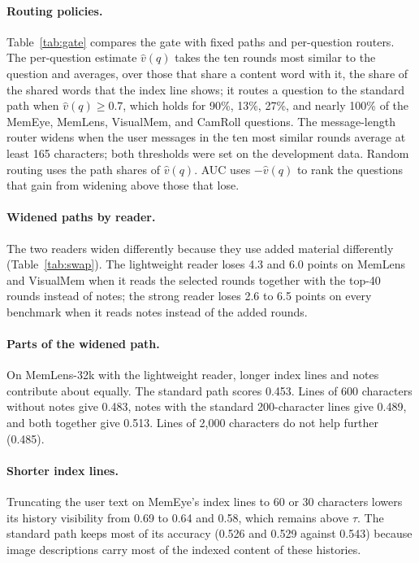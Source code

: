 \paragraph{Routing policies.} Table~\ref{tab:gate} compares the gate with fixed paths and per-question routers. The per-question estimate $\hat v(q)$ takes the ten rounds most similar to the question and averages, over those that share a content word with it, the share of the shared words that the index line shows; it routes a question to the standard path when $\hat v(q)\ge0.7$, which holds for 90\%, 13\%, 27\%, and nearly 100\% of the MemEye, MemLens, VisualMem, and CamRoll questions. The message-length router widens when the user messages in the ten most similar rounds average at least 165 characters; both thresholds were set on the development data. Random routing uses the path shares of $\hat v(q)$. AUC uses $-\hat v(q)$ to rank the questions that gain from widening above those that lose.



\paragraph{Widened paths by reader.} The two readers widen differently because they use added material differently (Table~\ref{tab:swap}). The lightweight reader loses 4.3 and 6.0 points on MemLens and VisualMem when it reads the selected rounds together with the top-40 rounds instead of notes; the strong reader loses 2.6 to 6.5 points on every benchmark when it reads notes instead of the added rounds.



\paragraph{Parts of the widened path.} On MemLens-32k with the lightweight reader, longer index lines and notes contribute about equally. The standard path scores 0.453. Lines of 600 characters without notes give 0.483, notes with the standard 200-character lines give 0.489, and both together give 0.513. Lines of 2,000 characters do not help further (0.485).

\paragraph{Shorter index lines.} Truncating the user text on MemEye's index lines to 60 or 30 characters lowers its history visibility from 0.69 to 0.64 and 0.58, which remains above $\tau$. The standard path keeps most of its accuracy (0.526 and 0.529 against 0.543) because image descriptions carry most of the indexed content of these histories.

